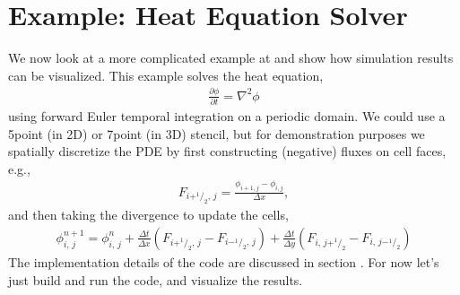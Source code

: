 \documentclass[letterpaper,10pt,english]{sphinxmanual}
\begin{document}
\begin{sphinxVerbatim}[commandchars=\\\{\}]
\end{sphinxVerbatim}


\section{Example: Heat Equation Solver}
\label{\detokenize{GettingStarted:example-heat-equation-solver}}\label{\detokenize{GettingStarted:sec-heat-equation}}
\sphinxAtStartPar
We now look at a more complicated example at
 and show how simulation results
can be visualized. This example solves the heat equation,
\begin{equation*}
\begin{split}\frac{\partial\phi}{\partial t} = \nabla^2\phi\end{split}
\end{equation*}
\sphinxAtStartPar
using forward Euler temporal integration on a periodic domain.  We could use a
5\sphinxhyphen{}point (in 2D) or 7\sphinxhyphen{}point (in 3D) stencil, but for demonstration purposes we
spatially discretize the PDE by first constructing (negative) fluxes on cell faces, e.g.,
\begin{equation*}
\begin{split}F_{i+^1\!/_2,\,j} = \frac{\phi_{i+1,j}-\phi_{i,j}}{\Delta x},\end{split}
\end{equation*}
\sphinxAtStartPar
and then taking the divergence to update the cells,
\begin{equation*}
\begin{split}\phi_{i,\,j}^{n+1} = \phi_{i,\,j}^n
+ \frac{\Delta t}{\Delta x}\left(F_{i+^1\!/_2,\,j}-F_{i-^1\!/_2,\,j}\right)
+ \frac{\Delta t}{\Delta y}\left(F_{i,\,j+^1\!/_2}-F_{i,\,j-^1\!/_2}\right)\end{split}
\end{equation*}
\sphinxAtStartPar
The implementation details of the code are discussed in section
{\hyperref[\detokenize{Basics:sec-basics-heat1}]{}}.  For now let’s just build and run the code, and
visualize the results.
\end{document}
